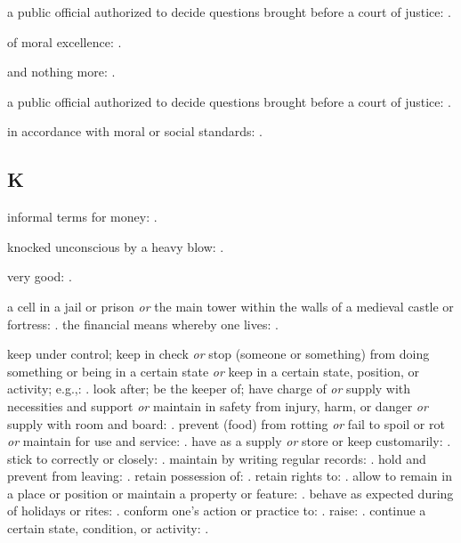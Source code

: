   a public official authorized to decide questions brought before a court of justice: .

  of moral excellence: .

  and nothing more: .

  a public official authorized to decide questions brought before a court of justice: .

  in accordance with moral or social standards: .

\subsection*{K}

  informal terms for money: .

  knocked unconscious by a heavy blow: .

  very good: .

  a cell in a jail or prison \textit{or} the main tower within the walls of a medieval castle or fortress: . the financial means whereby one lives: .

  keep under control; keep in check \textit{or} stop (someone or something) from doing something or being in a certain state \textit{or} keep in a certain state, position, or activity; e.g.,: . look after; be the keeper of; have charge of \textit{or} supply with necessities and support \textit{or} maintain in safety from injury, harm, or danger \textit{or} supply with room and board: . prevent (food) from rotting \textit{or} fail to spoil or rot \textit{or} maintain for use and service: . have as a supply \textit{or} store or keep customarily: . stick to correctly or closely: . maintain by writing regular records: . hold and prevent from leaving: . retain possession of: . retain rights to: . allow to remain in a place or position or maintain a property or feature: . behave as expected during of holidays or rites: . conform one's action or practice to: . raise: . continue a certain state, condition, or activity: .

